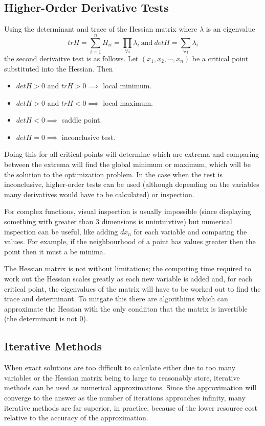 \documentclass[10pt,a4paper]{report}
\begin{document}
			\subsection{Higher-Order Derivative Tests}
				Using the determinant and trace of the Hessian matrix where $\lambda$ is an eigenvalue
				\begin{equation}
					trH = \sum_{i=1}^n H_{ii} = \prod_{\forall i} \lambda_i \ \text{and} \ detH = \sum_{\forall i} \lambda_i
				\end{equation}
				the second derivaitve test is as follows.
				Let $(x_1,x_2,\cdots,x_n)$ be a critical point substituted into the Hessian. Then \autocite{SecondDerivativeTest}
				\begin{itemize}
					\item $detH > 0$ and $trH > 0 \implies$ local minimum.
					\item $detH > 0$ and $trH < 0 \implies$ local maximum.
					\item  $detH < 0 \implies$ saddle point.
					\item $detH = 0 \implies$ inconclusive test.
				\end{itemize}
				Doing this for all critical points will determine which are extrema and comparing between the extrema will find the global
				minimum or maximum, which will be the solution to the optimization problem. In the case when the test is inconclusive, higher-order
				tests \autocite{ExtremumTest} can be used (although depending on the variables many derivatives would have to be calculated) or inspection. \par
				For complex functions, visual inspection is usually impossible (since displaying something with greater than 3 dimensions is unintuivtive) but numerical inspection can be useful, like
				adding $dx_n$ for each variable and comparing the values. For example, if the neighbourhood of a point has values greater then the point then it must a be minima. \par
				The Hessian matrix is not without limitations; the computing time required to work out the Hessian scales greatly as each new variable is added and, for each critical
				point, the eigenvalues of the matrix will have to be worked out to find the trace and determinant. To mitgate this there are algorithims which can approximate the Hessian
				with the only condiiton that the matrix is invertible (the determinant is not 0).

			\subsection{Iterative Methods}
					When exact solutions are too difficult to calculate either due to too many variables or the Hessian matrix being to large
					to reasonably store, iterative methods can be used as numerical approximations. Since the approximation will converge to the
					answer as the number of iterations approaches infinity, many iterative methods are far superior, in practice, because of the lower
					resource cost relative to the accuracy of the approximation. \par

\listoffigures
\printbibliography[title=References]
\end{document}
